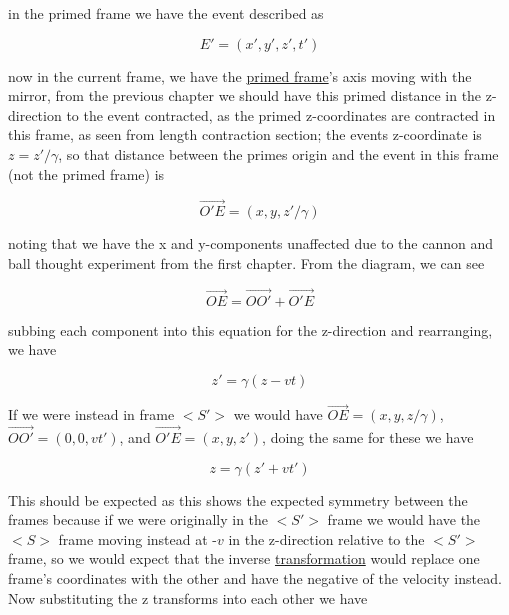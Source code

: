 in the primed frame we have the event described as

\begin{equation}
	E' = (x',y',z',t')
\end{equation}

now in the current frame, we have the \hyperlink{def-Primed-Frame}{primed frame}'s axis moving with the mirror, from the previous chapter we should have this primed distance in the z-direction to the event contracted, as the primed z-coordinates are contracted in this frame, as seen from length contraction section; the events z-coordinate is $z=z'/\gamma$, so that distance between the primes origin and the event in this frame (not the primed frame) is

\begin{equation}
	\overrightarrow{O'E} = (x,y,z'/\gamma)
\end{equation}

noting that we have the x and y-components unaffected due to the cannon and ball thought experiment from the first chapter. From the diagram, we can see

\begin{equation}
	\overrightarrow{OE}= \overrightarrow{OO'} + \overrightarrow{O'E}
	\label{eq: event}
\end{equation}

subbing each component into this equation for the z-direction and rearranging, we have

\begin{equation}
	z{'} = \gamma (z-vt)
\end{equation}

If we were instead in frame $<S'>$ we would have $\overrightarrow{OE}=(x,y,z/\gamma)$, $\overrightarrow{OO'}=(0,0,vt')$, and $\overrightarrow{O'E} = (x,y,z')$, doing the same for these we have

\begin{equation}
	z = \gamma (z'+vt')
\end{equation}

This should be expected as this shows the expected symmetry between the frames because if we were originally in the $<S'>$ frame we would have the $<S>$ frame moving instead at -$v$ in the z-direction relative to the $<S'>$ frame, so we would expect that the inverse \hyperlink{def-transform}{transformation} would replace one frame's coordinates with the other and have the negative of the velocity instead.
Now substituting the z transforms into each other we have

